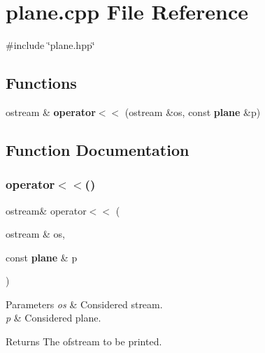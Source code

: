 \section{plane.\+cpp File Reference}
\label{plane_8cpp}
{\ttfamily \#include \char`\"{}plane.\+hpp\char`\"{}}\newline
\subsection*{Functions}
\begin{DoxyCompactItemize}
\item 
ostream \& \textbf{ operator$<$$<$} (ostream \&os, const \textbf{ plane} \&p)
\end{DoxyCompactItemize}


\subsection{Function Documentation}
\mbox{\label{plane_8cpp_ad9726324e2752901973bf9cdc8ae8c39}} 
\subsubsection{operator$<$$<$()}
{\footnotesize\ttfamily ostream\& operator$<$$<$ (\begin{DoxyParamCaption}\item[{ostream \&}]{os,  }\item[{const \textbf{ plane} \&}]{p }\end{DoxyParamCaption})}


\begin{DoxyParams}{Parameters}
{\em os} & Considered stream. \\
\hline
{\em p} & Considered plane. \\
\hline
\end{DoxyParams}
\begin{DoxyReturn}{Returns}
The ofstream to be printed. 
\end{DoxyReturn}
